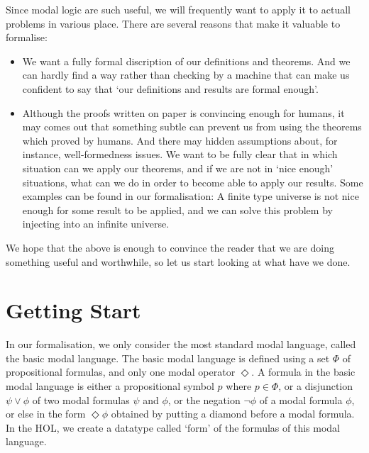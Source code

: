 \documentclass[letterpaper]{article}
\begin{document}
Since modal logic are such useful, we will frequently want to apply it to actuall problems in various place. There are several reasons that make it valuable to formalise:

\begin{itemize}

\item We want a fully formal discription of our definitions and theorems. And we can hardly find a way rather than checking by a machine that can make us confident to say that `our definitions and results are formal enough'. 


\item Although the proofs written on paper is convincing enough for humans, it may comes out that something subtle can prevent us from using the theorems which proved by humans. And there may hidden assumptions about, for instance, well-formedness issues. We want to be fully clear that in which situation can we apply our theorems, and if we are not in `nice enough' situations, what can we do in order to become able to apply our results. Some examples can be found in our formalisation: A finite type universe is not nice enough for some result to be applied, and we can solve this problem by injecting into an infinite universe. 

\end{itemize}

We hope that the above is enough to convince the reader that we are doing something useful and worthwhile, so let us start looking at what have we done. 

\section{Getting Start}

In our formalisation, we only consider the most standard modal language, called the basic modal language. The basic modal language is defined using a set $\Phi$ of propositional formulas, and only one modal operator $\Diamond$. A formula in the basic modal language is either a propositional symbol $p$ where $p\in \Phi$, or a disjunction $\psi\lor\phi$  of two modal formulas $\psi$ and $\phi$, or the negation $\lnot \phi$ of a modal formula $\phi$, or else in the form $\Diamond \phi$ obtained by putting a diamond before a modal formula. In the HOL, we create a datatype called `form' of the formulas of this modal language. 
\end{document}
